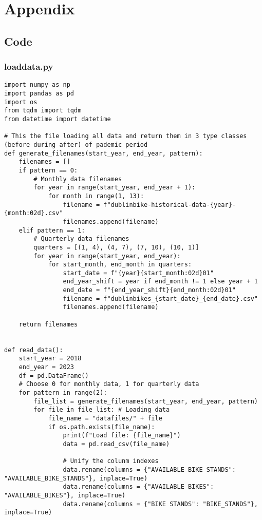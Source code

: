 \chapter{Appendix}
\section{Code}
\subsection{loaddata.py}\label{Metropolis_Uniform}
\lstset{style=PythonStyle}
\begin{lstlisting}
import numpy as np
import pandas as pd
import os
from tqdm import tqdm
from datetime import datetime

# This the file loading all data and return them in 3 type classes (before during after) of pademic period
def generate_filenames(start_year, end_year, pattern):
    filenames = []
    if pattern == 0:
        # Monthly data filenames
        for year in range(start_year, end_year + 1):
            for month in range(1, 13):
                filename = f"dublinbike-historical-data-{year}-{month:02d}.csv"
                filenames.append(filename)
    elif pattern == 1:
        # Quarterly data filenames
        quarters = [(1, 4), (4, 7), (7, 10), (10, 1)]
        for year in range(start_year, end_year):
            for start_month, end_month in quarters:
                start_date = f"{year}{start_month:02d}01"
                end_year_shift = year if end_month != 1 else year + 1
                end_date = f"{end_year_shift}{end_month:02d}01"
                filename = f"dublinbikes_{start_date}_{end_date}.csv"
                filenames.append(filename)

    return filenames


def read_data():
    start_year = 2018
    end_year = 2023
    df = pd.DataFrame()
    # Choose 0 for monthly data, 1 for quarterly data
    for pattern in range(2):
        file_list = generate_filenames(start_year, end_year, pattern)
        for file in file_list: # Loading data
            file_name = "datafiles/" + file
            if os.path.exists(file_name): 
                print(f"Load file: {file_name}")
                data = pd.read_csv(file_name)

                # Unify the colunm indexes
                data.rename(columns = {"AVAILABLE BIKE STANDS": "AVAILABLE_BIKE_STANDS"}, inplace=True)
                data.rename(columns = {"AVAILABLE BIKES": "AVAILABLE_BIKES"}, inplace=True)
                data.rename(columns = {"BIKE STANDS": "BIKE_STANDS"}, inplace=True)
                

\end{lstlisting}
